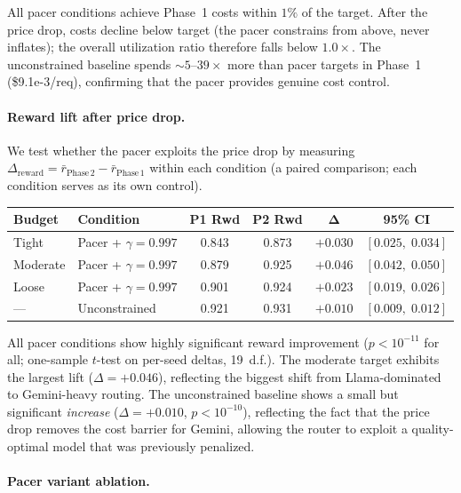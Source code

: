 \noindent
All pacer conditions achieve Phase~1 costs within $1\%$ of the target.
After the price drop, costs decline below target (the pacer constrains
from above, never inflates); the overall utilization ratio therefore
falls below $1.0\times$.
The unconstrained baseline spends ${\sim}5$--$39\times$ more than pacer
targets in Phase~1 (\$9.1e-3/req), confirming that the pacer
provides genuine cost control.

\paragraph{Reward lift after price drop.}
We test whether the pacer exploits the price drop by measuring
$\Delta_\mathrm{reward} = \bar{r}_\mathrm{Phase\,2} -
\bar{r}_\mathrm{Phase\,1}$ within each condition (a paired
comparison; each condition serves as its own control).

\begin{center}
\small
\begin{tabular}{@{}llcccc@{}}
\toprule
\textbf{Budget} & \textbf{Condition} & \textbf{P1 Rwd} & \textbf{P2 Rwd} & $\boldsymbol{\Delta}$ & \textbf{95\% CI} \\
\midrule
Tight    & Pacer + $\gamma{=}0.997$ & 0.843 & 0.873 & $+0.030$ & $[0.025,\; 0.034]$ \\
Moderate & Pacer + $\gamma{=}0.997$ & 0.879 & 0.925 & $+0.046$ & $[0.042,\; 0.050]$ \\
Loose    & Pacer + $\gamma{=}0.997$ & 0.901 & 0.924 & $+0.023$ & $[0.019,\; 0.026]$ \\
\midrule
---      & Unconstrained            & 0.921 & 0.931 & $+0.010$ & $[0.009,\; 0.012]$ \\
\bottomrule
\end{tabular}
\end{center}

\noindent
All pacer conditions show highly significant reward improvement
($p < 10^{-11}$ for all; one-sample $t$-test on per-seed deltas,
19~d.f.).  The moderate target exhibits the largest lift
($\Delta{=}+0.046$), reflecting the biggest shift from
Llama-dominated to Gemini-heavy routing.
The unconstrained baseline shows a small but significant
\emph{increase} ($\Delta{=}+0.010$, $p < 10^{-10}$), reflecting the
fact that the price drop removes the cost barrier for Gemini, allowing
the router to exploit a quality-optimal model that was previously
penalized.

\paragraph{Pacer variant ablation.}

